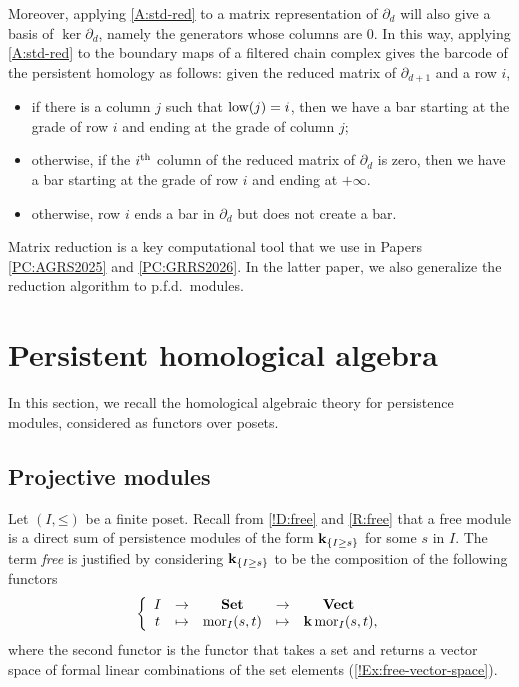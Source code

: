 Moreover, applying \cref{A:std-red} to a matrix representation of $\partial_d$ will also give a basis of $\ker \partial_d$, namely the generators whose columns are $0$. In this way, applying \cref{A:std-red} to the boundary maps of a filtered chain complex gives the barcode of the persistent homology as follows: given the reduced matrix of $\partial_{d + 1}$ and a row $i$,
\begin{itemize}
  \item if there is a column $j$ such that $\operatorname{low}(j) = i$, then we have a bar starting at the grade of row $i$ and ending at the grade of column $j$;
  \item otherwise, if the $i^{\text{th}}$ column of the reduced matrix of $\partial_d$ is zero, then we have a bar starting at the grade of row $i$ and ending at $+\infty$.
  \item otherwise, row $i$ ends a bar in $\partial_d$ but does not create a bar.
\end{itemize}

Matrix reduction is a key computational tool that we use in Papers \ref{PC:AGRS2025} and \ref{PC:GRRS2026}. In the latter paper, we also generalize the reduction algorithm to p.f.d.\ modules.


\section{Persistent homological algebra}
\label{S:persistent-homological-algebra}

In this section, we recall the homological algebraic theory for persistence modules, considered as functors over posets.

\subsection{Projective modules}

Let $(I, \mathord{\leq})$ be a finite poset. Recall from \cref{!D:free} and \cref{R:free} that a free module is a direct sum of persistence modules of the form $\mathbf{k}_{\{I \geq s\}}$ for some $s$ in $I$. The term \textit{free} is justified by considering $\mathbf{k}_{\{I \geq s\}}$ to be the composition of the following functors
\[
  \left\{ \begin{array}{ccccc}
    I & \to & \Set & \to & \Vect \\
    t & \mapsto & \mor_I(s, t) & \mapsto & \K \mor_I(s, t) \mathrlap{,}  %
  \end{array} \right.
\]
where the second functor is the functor that takes a set and returns a vector space of formal linear combinations of the set elements (\cref{!Ex:free-vector-space}).

